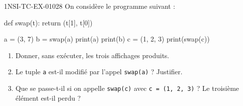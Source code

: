 \begin{exercice}{1NSI-TC-EX-010}{2}{8}
On considère le programme suivant :
\begin{python}
def swap(t):
    return (t[1], t[0])

a = (3, 7)
b = swap(a)
print(a)
print(b)
c = (1, 2, 3)
print(swap(c))
\end{python}
\begin{enumerate}
  \item Donner, sans exécuter, les trois affichages produits.
  \item Le tuple \lstinline{a} est-il modifié par l'appel \lstinline{swap(a)} ? Justifier.
  \item Que se passe-t-il si on appelle \lstinline{swap(c)} avec \lstinline{c = (1, 2, 3)} ?
        Le troisième élément est-il perdu ?
\end{enumerate}
\end{exercice}
